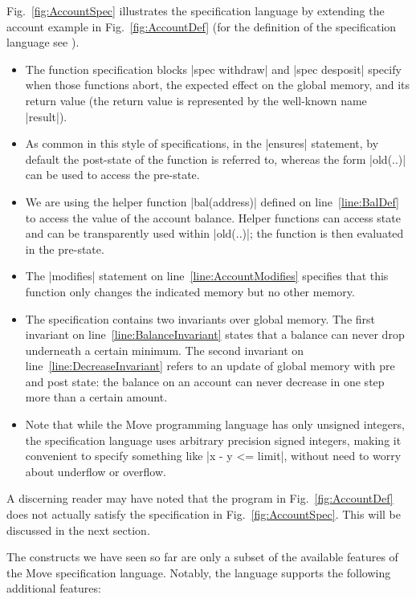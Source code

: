 Fig.~\ref{fig:AccountSpec} illustrates the specification language by extending
the account example in Fig.~\ref{fig:AccountDef} (for the definition of the
specification language see \cite{MOVE_SPEC_LANG_DEF}).
\begin{itemize}
\item The function specification blocks |spec withdraw| and |spec desposit|
  specify when those functions abort, the expected effect on the global memory,
  and its return value (the return value is represented by the well-known name
  |result|).
\item As common in this style of specifications, in the |ensures| statement, by
  default the post-state of the function is referred to, whereas the form
  |old(..)| can be used to access the pre-state.
\item We are using the helper function |bal(address)| defined on
  line~\ref{line:BalDef} to access the value of the account balance. Helper
  functions can access state and can be transparently used within |old(..)|; the
  function is then evaluated in the pre-state.
\item The |modifies| statement on line~\ref{line:AccountModifies} specifies that
  this function only changes the indicated memory but no other memory.
\item The specification contains two invariants over global memory. The first
  invariant on line~\ref{line:BalanceInvariant} states that a balance can never
  drop underneath a certain minimum. The second invariant on
  line~\ref{line:DecreaseInvariant} refers to an update of global memory with
  pre and post state: the balance on an account can never decrease in one step
  more than a certain amount.
\item Note that while the Move programming language has only unsigned integers,
  the specification language uses arbitrary precision signed integers, making it
  convenient to specify something like |x - y <= limit|, without need to worry
  about underflow or overflow.
\end{itemize}

A discerning reader may have noted that the program in Fig.~\ref{fig:AccountDef}
does not actually satisfy the specification in Fig.~\ref{fig:AccountSpec}. This
will be discussed in the next section.

The constructs we have seen so far are only a subset of the available features
of the Move specification language. Notably, the language supports the following
additional features:

